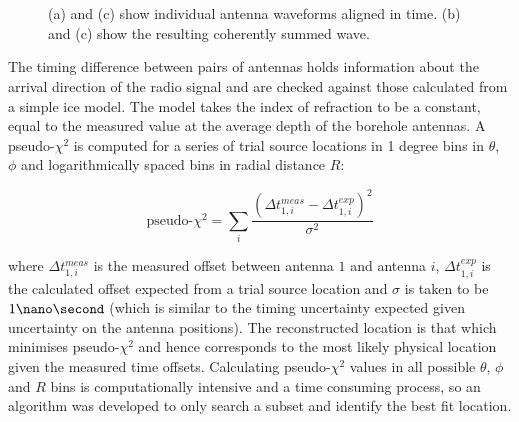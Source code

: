%



\begin{figure}[htpb]
  \hfill
  \\
  \hfill
  \\
  \hfill
  \caption{(a) and (c) show individual antenna waveforms aligned in time. (b) and (c) show the resulting coherently summed wave.} 
  \label{fig:analysis:Reconstruction:CSW-Example}
\end{figure}


The timing difference between pairs of antennas holds information about the arrival direction of the radio signal and are checked against those calculated from a simple ice model. The model takes the index of refraction to be a constant, equal to the measured value at the average depth of the borehole antennas. A pseudo-$\chi^{2}$ is computed for a series of trial source locations in 1 degree bins in $\theta$, $\phi$ and logarithmically spaced bins in radial distance $R$:

\begin{equation}
  \mbox{pseudo-}\chi^{2} = \sum_{i} \frac{(\Delta t_{1,i}^{meas} - \Delta t_{1,i}^{exp})^{2}}{\sigma^{2}}
  \label{eq:analysis:Reconstruction:ChiSq}
\end{equation}


\noindent  where $\Delta t_{1,i}^{meas}$ is the measured offset between antenna $1$ and antenna $i$, $\Delta t_{1,i}^{exp}$ is the calculated offset expected from a trial source location and $\sigma$ is taken to be $1 \nano \second$ (which is similar to the timing uncertainty expected given uncertainty on the antenna positions). The reconstructed location is that which minimises pseudo-$\chi^{2}$ and hence corresponds to the most likely physical location given the measured time offsets. Calculating pseudo-$\chi^{2}$ values in all possible $\theta$, $\phi$ and $R$ bins is computationally intensive and a time consuming process, so an algorithm was developed to only search a subset and identify the best fit location.


